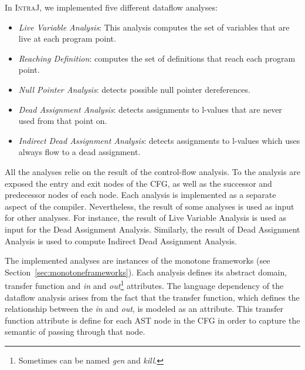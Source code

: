 In \textsc{IntraJ}, we implemented five different dataflow analyses:
\begin{itemize}
  \item \emph{Live Variable Analysis}: This analysis computes the set of variables that are live at each program point.
  \item \emph{Reaching Definition}: computes the set of definitions that reach each program point.
  \item \emph{Null Pointer Analysis}: detects possible null pointer dereferences.
  \item \emph{Dead Assignment Analysis}: detects assignments to l-values that are never used from that point on.
  \item \emph{Indirect Dead Assignment Analysis}: detects assignments to l-values which uses always flow to a dead assignment.
\end{itemize}
All the analyses relie on the result of the control-flow analysis. To the analysis are exposed
the entry and exit nodes of the CFG, as well as the successor and predecessor
nodes of each node.
Each analysis is implemented as a separate aspect of the compiler. Nevertheless,
the result of some analyses is used as input for other analyses. For instance,
the result of Live Variable Analysis is used as input for the Dead Assignment Analysis.
Similarly, the result of Dead Assignment Analysis is used to compute Indirect Dead Assignment Analysis.

The implemented analyses are instances of the monotone frameworks (see Section~\ref{sec:monotoneframeworks}).
Each analysis defines its abstract domain, transfer function and \emph{in} and
\emph{out}\footnote{Sometimes can be named \emph{gen} and \emph{kill}.} attributes.
The language dependency of the dataflow analysis arises from the fact that the
transfer function, which defines the relationship between the \emph{in} and \emph{out},
is modeled as an attribute. This transfer function attribute is
define for each AST node in the CFG in order to capture the semantic of passing
through that node.



